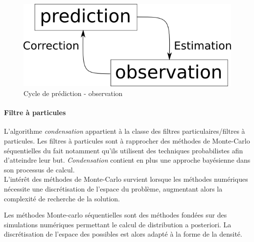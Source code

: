 \documentclass[a4paper,12pt]{report}
\begin{document}
\begin{figure}[hbtp]

\includegraphics[scale=0.5]{figurePredictionObservationCycle.png}
\centering
\caption{Cycle de prédiction - observation}
\end{figure}

\paragraph{Filtre à particules}
L'algorithme \textit{condensation} appartient à la classe des filtres particulaires/filtres à particules. Les filtres à particules sont à rapprocher des méthodes de Monte-Carlo séquentielles du fait notamment qu'ils utilisent des techniques probabilistes afin d'atteindre leur but.
\textit{Condensation} contient en plus une approche bayésienne dans son processus de calcul.\\

L'intérêt des méthodes de Monte-Carlo survient lorsque les méthodes numériques nécessite une discrétisation de l'espace du problème, augmentant alors la complexité de recherche de la solution.

Les méthodes Monte-carlo séquentielles sont des méthodes fondées sur des simulations numériques permettant le calcul de distribution a posteriori. La discrétisation de l'espace des possibles est alors adapté à la forme de la densité.
\end{document}

